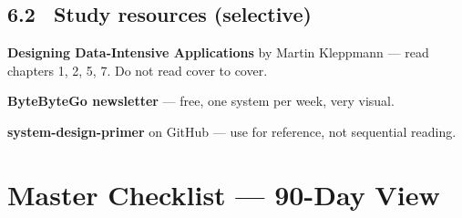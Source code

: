 \documentclass[11pt, a4paper]{article}
\begin{document}
\subsection{6.2 \ Study resources (selective)}

\begin{checklist}
  \item \textbf{Designing Data-Intensive Applications} by Martin Kleppmann — read chapters 1, 2, 5, 7. Do not read cover to cover.
  \item \textbf{ByteByteGo newsletter} — free, one system per week, very visual.
  \item \textbf{system-design-primer} on GitHub — use for reference, not sequential reading.
\end{checklist}

\section{Master Checklist — 90-Day View}
\end{document}
